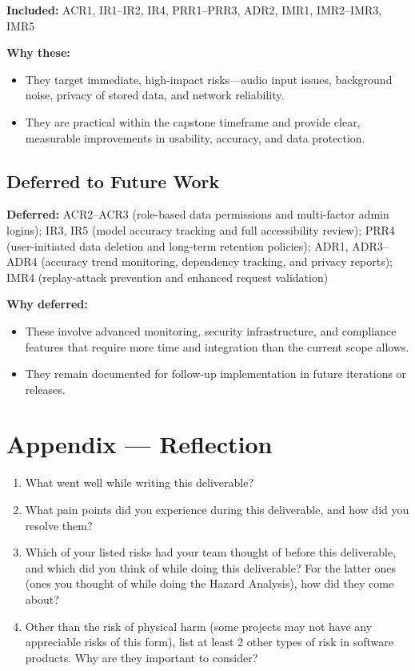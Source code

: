\documentclass{article}
\begin{document}
\noindent \textbf{Included:} ACR1, IR1--IR2, IR4, PRR1--PRR3, ADR2, IMR1, IMR2--IMR3, IMR5

\vspace{2mm}
\noindent \textbf{Why these:}
\begin{itemize}
  \item They target immediate, high-impact risks—audio input issues, background noise, privacy of stored data, and network reliability.
  \item They are practical within the capstone timeframe and provide clear, measurable improvements in usability, accuracy, and data protection.
\end{itemize}

\subsection{Deferred to Future Work}

\noindent \textbf{Deferred:} ACR2--ACR3 (role-based data permissions and multi-factor admin logins); IR3, IR5 (model accuracy tracking and full accessibility review); PRR4 (user-initiated data deletion and long-term retention policies); ADR1, ADR3--ADR4 (accuracy trend monitoring, dependency tracking, and privacy reports); IMR4 (replay-attack prevention and enhanced request validation)

\vspace{2mm}
\noindent \textbf{Why deferred:}
\begin{itemize}
  \item These involve advanced monitoring, security infrastructure, and compliance features that require more time and integration than the current scope allows.
  \item They remain documented for follow-up implementation in future iterations or releases.
\end{itemize}

\newpage{}

\section*{Appendix --- Reflection}




\begin{enumerate}
    \item What went well while writing this deliverable? 
    \item What pain points did you experience during this deliverable, and how
    did you resolve them?
    \item Which of your listed risks had your team thought of before this
    deliverable, and which did you think of while doing this deliverable? For
    the latter ones (ones you thought of while doing the Hazard Analysis), how
    did they come about?
    \item Other than the risk of physical harm (some projects may not have any
    appreciable risks of this form), list at least 2 other types of risk in
    software products. Why are they important to consider?
\end{enumerate}
\end{document}
